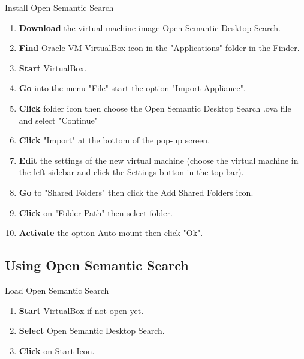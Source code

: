 \documentclass[10pt,a4paper]{article}
\begin{document}
\begin{textbox}{Install Open Semantic Search}
 

  

\begin{enumerate}
\item \textbf{Download} the virtual machine image Open Semantic Desktop Search. 
\item \textbf {Find} Oracle VM VirtualBox icon in the "Applications" folder in the Finder.
\item \textbf{Start} VirtualBox.
\item \textbf{Go} into the menu "File" start the option "Import Appliance".
\item \textbf{Click} folder icon then choose the Open Semantic Desktop Search .ova file and select "Continue"
\item \textbf{Click} "Import" at the bottom of the pop-up screen.
\item \textbf{Edit} the settings of the new virtual machine (choose the virtual machine in the left sidebar and click the Settings button in the top bar).
\item \textbf{Go} to "Shared Folders" then click the Add Shared Folders icon.
\item \textbf{Click} on "Folder Path" then select folder.
\item \textbf{Activate} the option Auto-mount then click "Ok".
\end{enumerate}

\end{textbox}

\subsection{Using Open Semantic Search}

\begin{textbox}{Load Open Semantic Search}
 

  

\begin{enumerate}
\item \textbf{Start} VirtualBox if not open yet.
\item \textbf{Select} Open Semantic Desktop Search.
\item \textbf{Click} on Start Icon. 
\end{enumerate}

\end{textbox}
\end{document}
